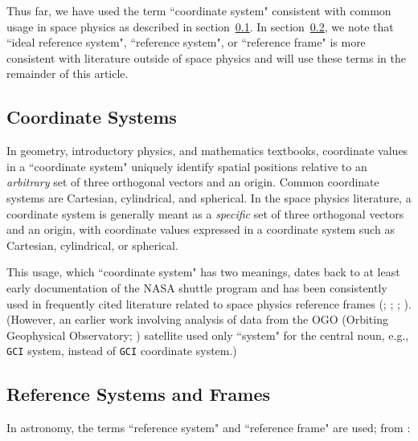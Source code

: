 \documentclass[draft]{agujournal2019}
\begin{document}
Thus far, we have used the term ``coordinate system" consistent with common usage in space physics as described in section~\ref{sect:coordsystems}. In section~\ref{sect:refsystems}, we note that ``ideal reference system", ``reference system", or ``reference frame" is more consistent with literature outside of space physics and will use these terms in the remainder of this article.

\subsection{Coordinate Systems}
\label{sect:coordsystems}

In geometry, introductory physics, and mathematics textbooks, coordinate values in a ``coordinate system" uniquely identify spatial positions relative to an {\it arbitrary} set of three orthogonal vectors and an origin. Common coordinate systems are Cartesian, cylindrical, and spherical. In the space physics literature, a coordinate system is generally meant as a {\it specific} set of three orthogonal vectors and an origin, with coordinate values expressed in a coordinate system such as Cartesian, cylindrical, or spherical.

This usage, which ``coordinate system" has two meanings, dates back to at least early documentation of the NASA shuttle program \cite{Davis1974} and has been consistently used in frequently cited literature related to space physics reference frames (; ; ; ). (However, an earlier work involving analysis of data from the OGO (Orbiting Geophysical Observatory; ) satellite used only ``system" for the central noun, e.g., \texttt{GCI} system, instead of \texttt{GCI} coordinate system.)


\subsection{Reference Systems and Frames}
\label{sect:refsystems}


In astronomy, the terms ``reference system" and ``reference frame" are used; from :
\end{document}
